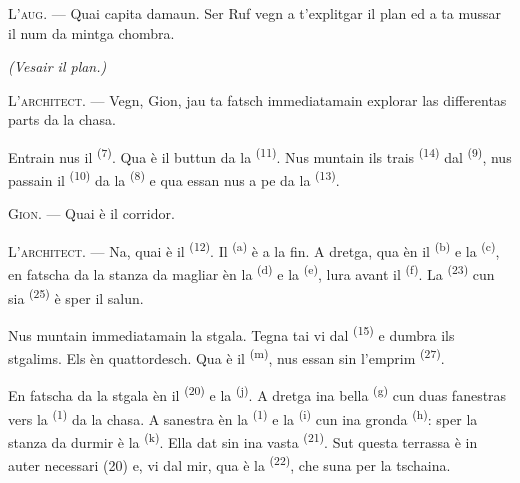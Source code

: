 \textsc{L'aug}. --- Quai capita damaun. Ser Ruf vegn a t'explitgar il plan ed a ta
mussar il num da mintga chombra.

\VUsaut{3.0mm}
\VUsaut{2.4mm}

{\centering\textit{(Vesair il plan.)}\par}
\VUsaut{2.4mm}

\textsc{L'architect}. --- Vegn, Gion, jau ta fatsch immediatamain explorar las
differentas parts da la chasa.

Entrain nus il  \textsuperscript{(7)}. Qua è il buttun da la
 \textsuperscript{(11)}. Nus muntain ils trais 
\textsuperscript{(14)} dal  \textsuperscript{(9)}, nus passain il
 \textsuperscript{(10)} da la 
\textsuperscript{(8)} e qua essan nus a pe da la 
\textsuperscript{(13)}.

\textsc{Gion}. --- Quai è il corridor.

\textsc{L'architect}. --- Na, quai è il  \textsuperscript{(12)}. Il
 \textsuperscript{(a)} è a la fin. A dretga, qua èn il
 \textsuperscript{(b)} e la 
\textsuperscript{(c)}, en fatscha da la stanza da magliar èn la 
\textsuperscript{(d)} e la  \textsuperscript{(e)}, lura
avant il \textsuperscript{(f)}. La 
\textsuperscript{(23)} cun sia  \textsuperscript{(25)} è sper
il salun.

Nus muntain immediatamain la stgala. Tegna tai vi dal 
\textsuperscript{(15)} e dumbra ils stgalims. Els èn quattordesch. Qua è il
 \textsuperscript{(m)}, nus essan sin l'emprim 
\textsuperscript{(27)}.

\VUsaut{3.0mm}
\VUsaut{3.0mm}

En fatscha da la stgala èn il  \textsuperscript{(20)} e la
 \textsuperscript{(j)}. A dretga ina bella 
\textsuperscript{(g)} cun duas fanestras vers la 
\textsuperscript{(1)} da la chasa. A sanestra èn la 
\textsuperscript{(1)} e la  \textsuperscript{(i)} cun ina
gronda  \textsuperscript{(h)}: sper la stanza da durmir è la
 \textsuperscript{(k)}. Ella dat sin ina vasta
 \textsuperscript{(21)}. Sut questa terrassa è in auter necessari
(20) e, vi dal mir, qua è la  \textsuperscript{(22)}, che suna per la
tschaina.

